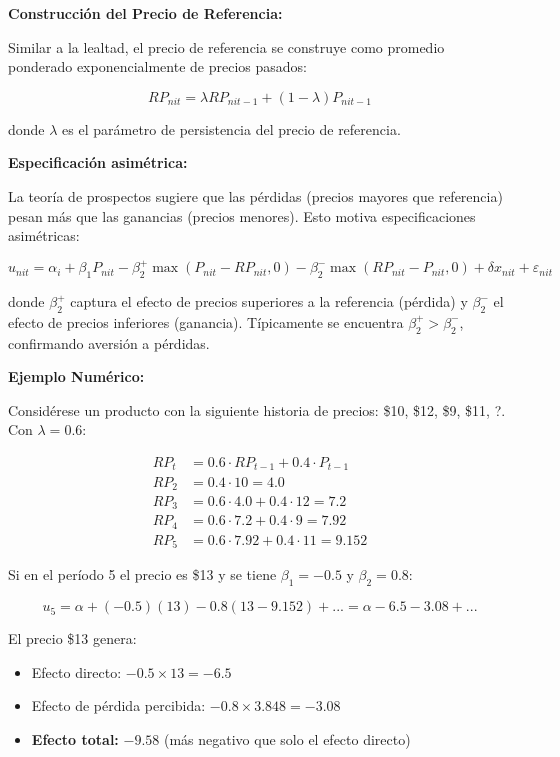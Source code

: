 \documentclass[
]{book}
\providecommand{\tightlist}{%
  \setlength{\itemsep}{0pt}\setlength{\parskip}{0pt}}
\begin{document}
\textbf{Construcción del Precio de Referencia:}

Similar a la lealtad, el precio de referencia se construye como promedio ponderado exponencialmente de precios pasados:

\begin{equation}
RP_{nit} = \lambda RP_{nit-1} + (1-\lambda) P_{nit-1}
\label{eq:refprice}
\end{equation}

donde \(\lambda\) es el parámetro de persistencia del precio de referencia.

\textbf{Especificación asimétrica:}

La teoría de prospectos sugiere que las pérdidas (precios mayores que referencia) pesan más que las ganancias (precios menores). Esto motiva especificaciones asimétricas:

\begin{equation}
u_{nit} = \alpha_i + \beta_1 P_{nit} - \beta_2^+ \max(P_{nit} - RP_{nit}, 0) - \beta_2^- \max(RP_{nit} - P_{nit}, 0) + \delta x_{nit} + \varepsilon_{nit}
\label{eq:utilasym}
\end{equation}

donde \(\beta_2^+\) captura el efecto de precios superiores a la referencia (pérdida) y \(\beta_2^-\) el efecto de precios inferiores (ganancia). Típicamente se encuentra \(\beta_2^+ > \beta_2^-\), confirmando aversión a pérdidas.

\textbf{Ejemplo Numérico:}

Considérese un producto con la siguiente historia de precios: \$10, \$12, \$9, \$11, ?.
Con \(\lambda = 0.6\):

\[
\begin{aligned}
RP_t &= 0.6 \cdot RP_{t-1} + 0.4 \cdot P_{t-1}\\
RP_2 &= 0.4 \cdot 10 = 4.0\\
RP_3 &= 0.6 \cdot 4.0 + 0.4 \cdot 12 = 7.2\\
RP_4 &= 0.6 \cdot 7.2 + 0.4 \cdot 9 = 7.92\\
RP_5 &= 0.6 \cdot 7.92 + 0.4 \cdot 11 = 9.152
\end{aligned}
\]

Si en el período 5 el precio es \$13 y se tiene \(\beta_1 = -0.5\) y \(\beta_2 = 0.8\):

\[u_5 = \alpha + (-0.5)(13) - 0.8(13 - 9.152) + ... = \alpha - 6.5 - 3.08 + ... \]

El precio \$13 genera:

\begin{itemize}
\tightlist
\item
  Efecto directo: \(-0.5 \times 13 = -6.5\)
\item
  Efecto de pérdida percibida: \(-0.8 \times 3.848 = -3.08\)
\item
  \textbf{Efecto total:} \(-9.58\) (más negativo que solo el efecto directo)
\end{itemize}
\end{document}
